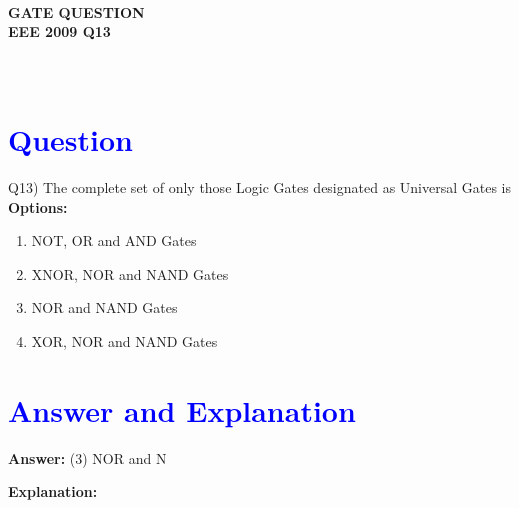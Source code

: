 \documentclass[a4paper,12pt]{article}
\begin{document}
\pagestyle{empty} %

\thispagestyle{fancy} %
\fancyhf{} %
\renewcommand{\headrulewidth}{0pt} %


\vspace{10cm}
\begin{center}
   
    {\LARGE \textbf{\textcolor{darkskyblue}{\\  GATE QUESTION \\ EEE 2009 Q13}}}
\end{center}
\vspace{-1cm} %

\section*{\textcolor{blue}{\\Question}}
Q13)  The complete set of only those Logic Gates designated as Universal Gates is\\

\hspace{-0.5cm}\textbf{Options:}
\begin{enumerate}
    \item NOT, OR and AND Gates
    \item XNOR, NOR and NAND Gates
    \item NOR and NAND Gates
    \item XOR, NOR and NAND Gates
\end{enumerate}
\vspace{1cm}
\section*{\textcolor{blue}{Answer and Explanation}}

\textbf{Answer:} (3) NOR and N
\vspace{0.5cm}

\textbf{Explanation:}
\end{document}
